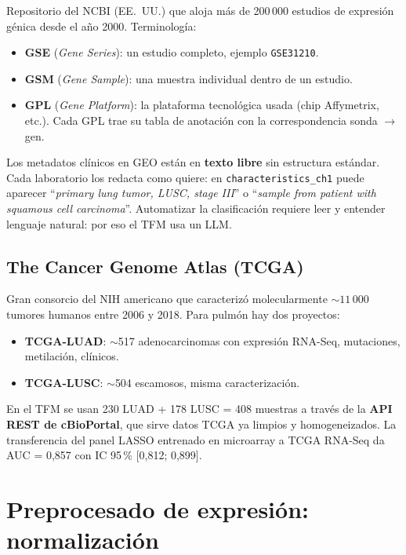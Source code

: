 \documentclass[11pt, a4paper]{article}
\begin{document}
Repositorio del NCBI (EE.\ UU.) que aloja m\'as de 200\,000 estudios de
expresi\'on g\'enica desde el a\~no 2000. Terminolog\'ia:

\begin{itemize}[leftmargin=1.2em]
  \item \textbf{GSE} (\emph{Gene Series}): un estudio completo, ejemplo
  \texttt{GSE31210}.
  \item \textbf{GSM} (\emph{Gene Sample}): una muestra individual dentro
  de un estudio.
  \item \textbf{GPL} (\emph{Gene Platform}): la plataforma tecnol\'ogica
  usada (chip Affymetrix, etc.). Cada GPL trae su tabla de anotaci\'on
  con la correspondencia sonda $\to$ gen.
\end{itemize}

Los metadatos cl\'inicos en GEO est\'an en \textbf{texto libre} sin
estructura est\'andar. Cada laboratorio los redacta como quiere: en
\texttt{characteristics\_ch1} puede aparecer ``\emph{primary lung tumor,
LUSC, stage III}'' o ``\emph{sample from patient with squamous cell
carcinoma}''. Automatizar la clasificaci\'on requiere leer y entender
lenguaje natural: por eso el TFM usa un LLM.

\subsection{The Cancer Genome Atlas (TCGA)}

Gran consorcio del NIH americano que caracteriz\'o molecularmente ${\sim}11\,000$
tumores humanos entre 2006 y 2018. Para pulm\'on hay dos proyectos:

\begin{itemize}[leftmargin=1.2em]
  \item \textbf{TCGA-LUAD}: $\sim$517 adenocarcinomas con expresi\'on
  RNA-Seq, mutaciones, metilaci\'on, cl\'inicos.
  \item \textbf{TCGA-LUSC}: $\sim$504 escamosos, misma caracterizaci\'on.
\end{itemize}

En el TFM se usan 230 LUAD + 178 LUSC = 408 muestras a trav\'es de la
\textbf{API REST de cBioPortal}, que sirve datos TCGA ya limpios y
homogeneizados. La transferencia del panel LASSO entrenado en microarray
a TCGA RNA-Seq da AUC = 0,857 con IC 95\,\% [0,812; 0,899].

\section{Preprocesado de expresi\'on: normalizaci\'on}
\end{document}
